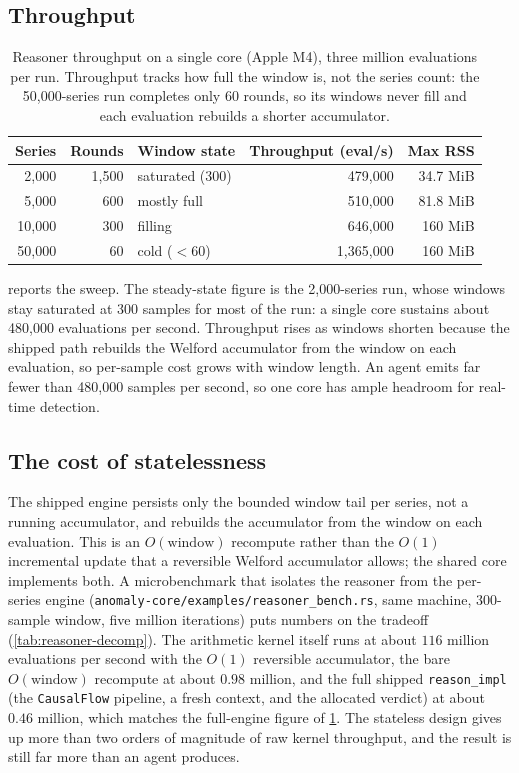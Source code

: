 \subsection{Throughput}
\begin{table}[t]
  \centering
  \caption{Reasoner throughput on a single core (Apple M4), three million
  evaluations per run. Throughput tracks how full the window is, not the series
  count: the 50{,}000-series run completes only 60 rounds, so its windows never
  fill and each evaluation rebuilds a shorter accumulator.}
  \label{tab:reasoner-perf}
  \begin{tabular}{rrlrr}
    \toprule
    Series & Rounds & Window state & Throughput (eval/s) & Max RSS \\
    \midrule
    2{,}000  & 1{,}500 & saturated (300) & 479{,}000   & 34.7 MiB \\
    5{,}000  & 600     & mostly full     & 510{,}000   & 81.8 MiB \\
    10{,}000 & 300     & filling         & 646{,}000   & 160 MiB  \\
    50{,}000 & 60      & cold ($<$60)    & 1{,}365{,}000 & 160 MiB \\
    \bottomrule
  \end{tabular}
\end{table}

 reports the sweep. The steady-state figure is the
2{,}000-series run, whose windows stay saturated at 300 samples for most of the
run: a single core sustains about 480{,}000 evaluations per second. Throughput
rises as windows shorten because the shipped path rebuilds the Welford
accumulator from the window on each evaluation, so per-sample cost grows with
window length. An agent emits far fewer than 480{,}000 samples per second, so one
core has ample headroom for real-time detection.

\subsection{The cost of statelessness}
The shipped engine persists only the bounded window tail per series, not a running
accumulator, and rebuilds the accumulator from the window on each evaluation. This
is an $O(\text{window})$ recompute rather than the $O(1)$ incremental update that a
reversible Welford accumulator allows; the shared core implements both. A
microbenchmark that isolates the reasoner from the per-series engine
(\texttt{anomaly-core/examples/reasoner\_bench.rs}, same machine, $300$-sample
window, five million iterations) puts numbers on the tradeoff
(\cref{tab:reasoner-decomp}). The arithmetic kernel itself runs at about $116$
million evaluations per second with the $O(1)$ reversible accumulator, the bare
$O(\text{window})$ recompute at about $0.98$ million, and the full shipped
\texttt{reason\_impl} (the \texttt{CausalFlow} pipeline, a fresh context, and the
allocated verdict) at about $0.46$ million, which matches the full-engine figure of
\cref{tab:reasoner-perf}. The stateless design gives up more than two orders of
magnitude of raw kernel throughput, and the result is still far more than an agent
produces.

